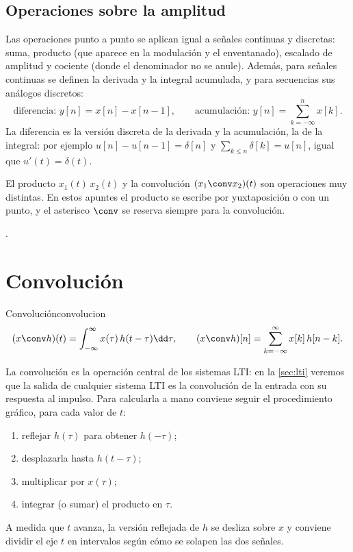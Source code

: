 \documentclass[11pt,a4paper]{scrartcl}
\begin{document}
\subsection{Operaciones sobre la amplitud}

Las operaciones punto a punto se aplican igual a señales continuas y discretas: suma, producto (que aparece en la modulación y el enventanado), escalado de amplitud y cociente (donde el denominador no se anule). Además, para señales continuas se definen la derivada y la integral acumulada, y para secuencias sus análogos discretos:
\[
  \text{diferencia: } y[n]=x[n]-x[n-1],\qquad \text{acumulación: } y[n]=\sum_{k=-\infty}^{n}x[k].
\]
La diferencia es la versión discreta de la derivada y la acumulación, la de la integral: por ejemplo $u[n]-u[n-1]=\delta[n]$ y $\sum_{k\le n}\delta[k]=u[n]$, igual que $u'(t)=\delta(t)$.

\begin{nota}
  El producto $x_1(t)\,x_2(t)$ y la convolución $(x_1\conv x_2)(t)$ son operaciones muy distintas. En estos apuntes el producto se escribe por yuxtaposición o con un punto, y el asterisco $\conv$ se reserva siempre para la convolución.
\end{nota}

\begin{flushright}\small\color{pdsgris}.\end{flushright}

\section{Convolución}\label{sec:convolucion}

\begin{definicion}{Convolución}{convolucion}
  \[
    (x\conv h)(t)=\int_{-\infty}^{\infty}x(\tau)\,h(t-\tau)\dd\tau,\qquad
    (x\conv h)[n]=\sum_{k=-\infty}^{\infty}x[k]\,h[n-k].
  \]
\end{definicion}

La convolución es la operación central de los sistemas LTI: en la \cref{sec:lti} veremos que la salida de cualquier sistema LTI es la convolución de la entrada con su respuesta al impulso. Para calcularla a mano conviene seguir el procedimiento gráfico, para cada valor de $t$:
\begin{enumerate}
  \item reflejar $h(\tau)$ para obtener $h(-\tau)$;
  \item desplazarla hasta $h(t-\tau)$;
  \item multiplicar por $x(\tau)$;
  \item integrar (o sumar) el producto en $\tau$.
\end{enumerate}
A medida que $t$ avanza, la versión reflejada de $h$ se desliza sobre $x$ y conviene dividir el eje $t$ en intervalos según cómo se solapen las dos señales.
\end{document}

